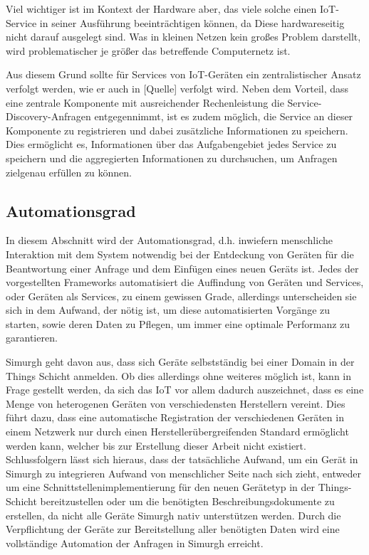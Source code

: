 \documentclass[conference,compsoc]{IEEEtran}
\begin{document}
Viel wichtiger ist im Kontext der Hardware aber, das viele solche einen IoT-Service in seiner Ausführung beeinträchtigen können, da Diese hardwareseitig nicht darauf ausgelegt sind. Was in kleinen Netzen kein großes Problem darstellt, wird problematischer je größer das betreffende Computernetz ist. 

Aus diesem Grund sollte für Services von IoT-Geräten ein zentralistischer Ansatz verfolgt werden, wie er auch in [Quelle] verfolgt wird. Neben dem Vorteil, dass eine zentrale Komponente mit ausreichender Rechenleistung die Service-Discovery-Anfragen entgegennimmt, ist es zudem möglich, die Service an dieser Komponente zu registrieren und dabei zusätzliche Informationen zu speichern. Dies ermöglicht es, Informationen über das Aufgabengebiet jedes Service zu speichern und die aggregierten Informationen zu durchsuchen, um Anfragen zielgenau erfüllen zu können. 


\subsection{Automationsgrad}

In diesem Abschnitt wird der Automationsgrad, d.h. inwiefern menschliche Interaktion mit dem System notwendig bei der Entdeckung von Geräten für die Beantwortung einer Anfrage und dem Einfügen eines neuen Geräts ist. Jedes der vorgestellten Frameworks automatisiert die Auffindung von Geräten und Services, oder Geräten als Services, zu einem gewissen Grade, allerdings unterscheiden sie sich in dem Aufwand, der nötig ist, um diese automatisierten Vorgänge zu starten, sowie deren Daten zu Pflegen, um immer eine optimale Performanz zu garantieren.

Simurgh geht davon aus, dass sich Geräte selbstständig bei einer Domain in der Things Schicht anmelden. Ob dies allerdings ohne weiteres möglich ist, kann in Frage gestellt werden, da sich das IoT vor allem dadurch auszeichnet, dass es eine Menge von heterogenen Geräten von verschiedensten Herstellern vereint. Dies führt dazu, dass eine automatische Registration der verschiedenen Geräten in einem Netzwerk nur durch einen Herstellerübergreifenden Standard ermöglicht werden kann, welcher bis zur Erstellung dieser Arbeit nicht existiert. Schlussfolgern lässt sich hieraus, dass der tatsächliche Aufwand, um ein Gerät in Simurgh zu integrieren Aufwand von menschlicher Seite nach sich zieht, entweder um eine Schnittstellenimplementierung für den neuen Gerätetyp in der Things-Schicht bereitzustellen oder um die benötigten Beschreibungsdokumente zu erstellen, da nicht alle Geräte Simurgh nativ unterstützen werden. Durch die Verpflichtung der Geräte zur Bereitstellung aller benötigten Daten wird eine vollständige Automation der Anfragen in Simurgh erreicht.
\end{document}
